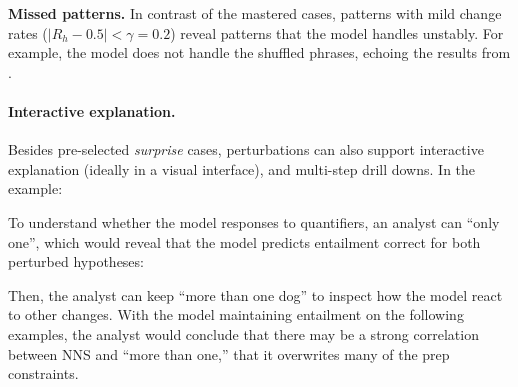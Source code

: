 \noindent\textbf{Missed patterns.}
In contrast of the mastered cases, patterns with mild change rates (\eg $|R_h-0.5| < \gamma=0.2$) reveal patterns that the model handles unstably.
For example, the model does not handle the shuffled phrases, echoing the results from \citet{mccoy2019right}.



\paragraph{Interactive explanation.}
Besides pre-selected \emph{surprise} cases, perturbations can also support interactive explanation (ideally in a visual interface), and multi-step drill downs.
In the example: 


To understand whether the model responses to quantifiers, an analyst can \BLANK ``only one'', which would reveal that the model predicts entailment correct for both perturbed hypotheses:


Then, the analyst can keep ``more than one dog'' to inspect how the model react to other changes. 
With the model maintaining entailment on the following examples, the analyst would conclude that there may be a strong correlation between NNS and ``more than one,'' that it overwrites many of the prep constraints.


